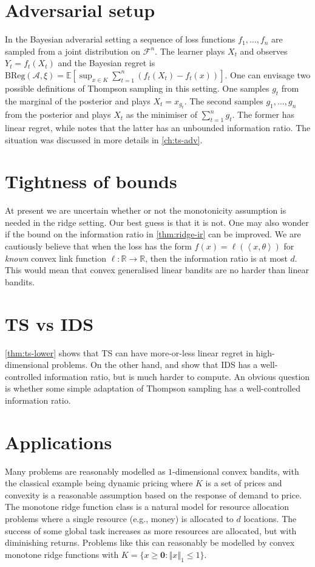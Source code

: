 \documentclass[letter, 12pt]{report}
\newcommand{\R}{\mathbb R}
\newcommand{\ip}[1]{\left \langle #1 \right \rangle}
\newcommand{\BReg}{\textrm{BReg}}
\newcommand{\norm}[1]{\left \Vert  #1 \right \Vert}
\newcommand{\E}{\mathbb E}
\newcommand{\sF}{\mathscr F}
\newcommand{\sA}{\mathscr A}
\newcommand{\zeros}{ \bm 0}
\newcommand{\1}{\mathbf{1}}
\newcommand{\ts}{\textsc{TS}\xspace}
\newcommand{\IDS}{\textsc{IDS}}
\theoremstyle{plain}
\theoremstyle{definition}
\theoremstyle{remark}
\begin{document}
\section{Adversarial setup} In the Bayesian adverarial setting a sequence of loss functions $f_1,\ldots,f_n$ are sampled from a joint distribution on $\sF^n$.
The learner plays $X_t$ and observes $Y_t = f_t(X_t)$ and the Bayesian regret is
$\BReg(\sA, \xi) = \E[\sup_{x \in K} \sum_{t=1}^n (f_t(X_t) - f_t(x))]$.
One can envisage two possible definitions of Thompson sampling in this setting. One samples $g_t$ from the marginal of the posterior and plays $X_t = x_{g_t}$.
The second samples $g_1,\ldots,g_n$ from the posterior and plays $X_t$ as the minimiser of $\sum_{t=1}^n g_t$.
The former has linear regret, while \cite{BDKP15} notes
that the latter has an unbounded information ratio. The situation was discussed in more details in \cref{ch:ts-adv}.
\section{Tightness of bounds} At present we are uncertain whether or not the monotonicity assumption is needed in the ridge setting. Our best guess is that it is not.
One may also wonder if the bound on the information ratio in \cref{thm:ridge-ir} can be improved. We are cautiously believe
that when the loss has the form $f(x) = \ell(\ip{x, \theta})$ for \textit{known} convex link function $\ell : \R \to \R$, then the information ratio is at most $d$.
This would mean that convex generalised linear bandits are no harder than linear bandits.

\section{\ts{} vs \IDS} \cref{thm:ts-lower} shows that \ts{} can have more-or-less linear regret in high-dimensional problems. On the other hand,
\cite{BE18} and \cite{Lat20-cvx} show that \IDS{} has a well-controlled information ratio, but is much harder to compute.
An obvious question is whether some simple adaptation of Thompson sampling has a well-controlled information ratio.
\section{Applications} Many problems are reasonably modelled as $1$-dimensional convex bandits, with the classical example being dynamic pricing
where $K$ is a set of prices and convexity is a reasonable assumption based on the response of demand to price.
The monotone ridge function class is a natural model for resource allocation problems where a single resource (e.g., money) is allocated to $d$ locations.
The success of some global task increases as more resources are allocated, but with diminishing returns. Problems like this can reasonably be modelled
by convex monotone ridge functions with $K = \{x \geq \zeros : \norm{x}_1 \leq 1\}$.
\end{document}
